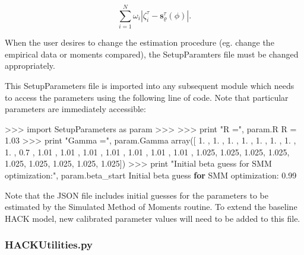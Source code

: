 \documentclass[]{article}
\newenvironment{Shaded}{}{}
\newcommand{\KeywordTok}[1]{\textcolor[rgb]{0.00,0.44,0.13}{\textbf{{#1}}}}
\newcommand{\DataTypeTok}[1]{\textcolor[rgb]{0.56,0.13,0.00}{{#1}}}
\newcommand{\DecValTok}[1]{\textcolor[rgb]{0.25,0.63,0.44}{{#1}}}
\newcommand{\FloatTok}[1]{\textcolor[rgb]{0.25,0.63,0.44}{{#1}}}
\newcommand{\CharTok}[1]{\textcolor[rgb]{0.25,0.44,0.63}{{#1}}}
\newcommand{\StringTok}[1]{\textcolor[rgb]{0.25,0.44,0.63}{{#1}}}
\newcommand{\NormalTok}[1]{{#1}}
\begin{document}
\[ \sum_{i=1}^{N} \omega_{i}|\zeta_{i}^{\tau}-\mathbf{s}^{\tau}_{\varrho}(\phi)|.\]

When the user desires to change the estimation procedure (eg. change the
empirical data or moments compared), the SetupParamters file must be
changed appropriately.

This SetupParameters file is imported into any subsequent module which
needs to access the parameters using the following line of code. Note
that particular parameters are immediately accessible:

\begin{Shaded}
\begin{Highlighting}[]
\NormalTok{>>> }\CharTok{import} \NormalTok{SetupParameters }\CharTok{as} \NormalTok{param}
\NormalTok{>>>}
\NormalTok{>>> }\DataTypeTok{print} \StringTok{"R ="}\NormalTok{, param.R}
\NormalTok{R = }\FloatTok{1.03}
\NormalTok{>>> }\DataTypeTok{print} \StringTok{"Gamma ="}\NormalTok{, param.Gamma}
\NormalTok{array([ }\DecValTok{1}\NormalTok{.   ,  }\DecValTok{1}\NormalTok{.   ,  }\DecValTok{1}\NormalTok{.   ,  }\DecValTok{1}\NormalTok{.   ,  }\DecValTok{1}\NormalTok{.   ,  }\DecValTok{1}\NormalTok{.   ,  }\DecValTok{1}\NormalTok{.   ,  }\DecValTok{1}\NormalTok{.   ,}
        \FloatTok{0.7}  \NormalTok{,  }\FloatTok{1.01} \NormalTok{,  }\FloatTok{1.01} \NormalTok{,  }\FloatTok{1.01} \NormalTok{,  }\FloatTok{1.01} \NormalTok{,  }\FloatTok{1.01} \NormalTok{,  }\FloatTok{1.01} \NormalTok{,  }\FloatTok{1.01} \NormalTok{,}
        \FloatTok{1.025}\NormalTok{,  }\FloatTok{1.025}\NormalTok{,  }\FloatTok{1.025}\NormalTok{,  }\FloatTok{1.025}\NormalTok{,  }\FloatTok{1.025}\NormalTok{,  }\FloatTok{1.025}\NormalTok{,  }\FloatTok{1.025}\NormalTok{,  }\FloatTok{1.025}\NormalTok{,}
        \FloatTok{1.025}\NormalTok{])}
\NormalTok{>>> }\DataTypeTok{print} \StringTok{"Initial beta guess for SMM optimization:"}\NormalTok{, param.beta_start}
\NormalTok{Initial beta guess }\KeywordTok{for} \NormalTok{SMM optimization: }\FloatTok{0.99}
\end{Highlighting}
\end{Shaded}

Note that the JSON file includes initial guesses for the parameters to
be estimated by the Simulated Method of Moments routine. To extend the
baseline HACK model, new calibrated parameter values will need to be
added to this file.

\subsubsection{HACKUtilities.py}\label{hackutilities.py}
\end{document}
